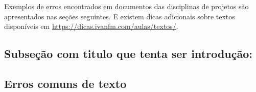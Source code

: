 Exemplos de erros encontrados em documentos das disciplinas de projetos são apresentados nas seções seguintes. E existem dicas adicionais sobre textos disponíveis em \url{https://dicas.ivanfm.com/aulas/textos/}.



\subsection{Subseção com titulo que tenta ser introdução:}
\label{erros-titulo-dois-pontos}

\subsection{Erros comuns de texto}
    
